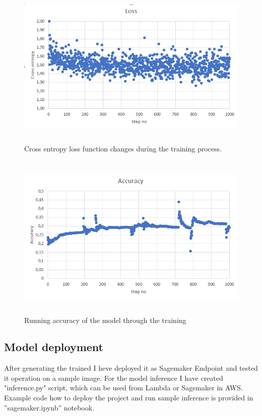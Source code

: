 \documentclass{article}
\begin{document}
\begin{figure}[ht]
	\centering
	\includegraphics[height=80mm]{../project/loss.png}
	\caption{Cross entropy loss function changes during the training process.}
	\label{fig:loss}
\end{figure}

\begin{figure}[ht]
	\centering
	\includegraphics[height=80mm]{../project/accuracy.png}
	\caption{Running accuracy of the model through the training}
	\label{fig:acc}
\end{figure}

\FloatBarrier
\subsection{Model deployment}
After generating the trained I heve deployed it as Sagemaker Endpoint and tested it operation on a sample image. For the model inference I have created "inference.py" script, which can be used from Lambda or Sagemaker in AWS. Example code how to deploy the project and run sample inference is provided in ''sagemaker.ipynb'' notebook.
\end{document}
